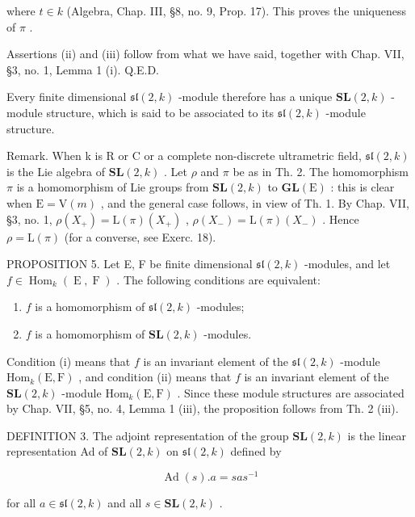 where \(t \in k\) (Algebra, Chap. III, §8, no. 9, Prop. 17). This proves the uniqueness of \(\pi\) .

Assertions (ii) and (iii) follow from what we have said, together with Chap. VII, §3, no. 1, Lemma 1 (i). Q.E.D.

Every finite dimensional \(\mathfrak{sl}(2,k)\) -module therefore has a unique \(\mathbf{SL}(2,k)\) -module structure, which is said to be associated to its \(\mathfrak{sl}(2,k)\) -module structure.

Remark. When k is R or C or a complete non-discrete ultrametric field, \(\mathfrak{sl}(2,k)\) is the Lie algebra of \(\mathbf{SL}(2,k)\) . Let \(\rho\) and \(\pi\) be as in Th. 2. The homomorphism \(\pi\) is a homomorphism of Lie groups from \(\mathbf{SL}(2,k)\) to \(\mathbf{GL}(\mathrm{E})\) : this is clear when \(\mathrm{E} = \mathrm{V}(m)\) , and the general case follows, in view of Th. 1. By Chap. VII, §3, no. 1, \(\rho(X_{+}) = \mathrm{L}(\pi)(X_{+})\) , \(\rho(X_{-}) = \mathrm{L}(\pi)(X_{-})\) . Hence \(\rho = \mathrm{L}(\pi)\) (for a converse, see Exerc. 18).

PROPOSITION 5. Let E, F be finite dimensional \(\mathfrak{sl}(2,k)\) -modules, and let \(f \in \operatorname{Hom}_{k}(\operatorname{E},\operatorname{F})\) . The following conditions are equivalent:

\begin{enumerate}
\def\labelenumi{(\roman{enumi})}
\item
  \(f\) is a homomorphism of \(\mathfrak{sl}(2,k)\) -modules;
\item
  \(f\) is a homomorphism of \(\mathbf{SL}(2,k)\) -modules.
\end{enumerate}

Condition (i) means that \(f\) is an invariant element of the \(\mathfrak{sl}(2,k)\) -module \(\mathrm{Hom}_k(\mathrm{E},\mathrm{F})\) , and condition (ii) means that \(f\) is an invariant element of the \(\mathbf{SL}(2,k)\) -module \(\mathrm{Hom}_k(\mathrm{E},\mathrm{F})\) . Since these module structures are associated by Chap. VII, §5, no. 4, Lemma 1 (iii), the proposition follows from Th. 2 (iii).

DEFINITION 3. The adjoint representation of the group \(\mathbf{SL}(2,k)\) is the linear representation Ad of \(\mathbf{SL}(2,k)\) on \(\mathfrak{sl}(2,k)\) defined by

\[
\operatorname{Ad} (s). a = s a s ^ {- 1}
\]

for all \(a \in \mathfrak{sl}(2, k)\) and all \(s \in \mathbf{SL}(2, k)\) .

